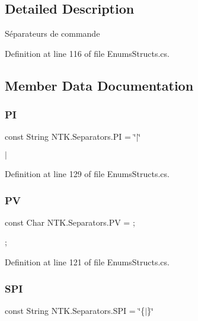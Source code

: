 \subsection{Detailed Description}
Séparateurs de commande 



Definition at line 116 of file Enums\+Structs.\+cs.



\subsection{Member Data Documentation}
\mbox{\label{struct_n_t_k_1_1_separators_a0948e5698ee8208e78c17ec45773f384}} 
\subsubsection{\texorpdfstring{PI}{PI}}
{\footnotesize\ttfamily const String N\+T\+K.\+Separators.\+PI = \char`\"{}$\vert$\char`\"{}}



$\vert$ 



Definition at line 129 of file Enums\+Structs.\+cs.

\mbox{\label{struct_n_t_k_1_1_separators_ad16bb38dc22e45801d45b2eeb614e6a0}} 
\subsubsection{\texorpdfstring{PV}{PV}}
{\footnotesize\ttfamily const Char N\+T\+K.\+Separators.\+PV = \textquotesingle{};\textquotesingle{}}



; 



Definition at line 121 of file Enums\+Structs.\+cs.

\mbox{\label{struct_n_t_k_1_1_separators_ab55c4094d17f022ac5cc628ae8d2b761}} 
\subsubsection{\texorpdfstring{SPI}{SPI}}
{\footnotesize\ttfamily const String N\+T\+K.\+Separators.\+S\+PI = \char`\"{}\{$\vert$\}\char`\"{}}




